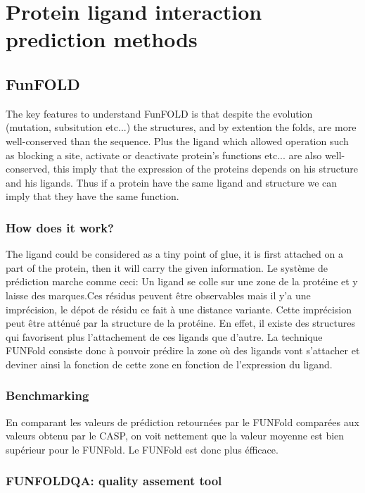 \section{Protein ligand interaction prediction methods}
\subsection{FunFOLD}
The key features to understand FunFOLD is that despite the evolution (mutation, subsitution etc...) the structures, and by extention the folds, are more well-conserved than the sequence. Plus the ligand which allowed operation such as blocking a site, activate or deactivate protein's functions etc... are also well-conserved, this imply that the expression of the proteins depends on his structure and his ligands. Thus if a protein have the same ligand and structure we can imply that they have the same function.
\newline
\subsubsection{How does it work?}
The ligand could be considered as a tiny point of glue, it is first attached on a part of the protein, then it will carry the given information.
Le système de prédiction marche comme ceci:
\newline
Un ligand se colle sur une zone de la protéine et y laisse des marques.Ces résidus peuvent être observables mais il y'a une imprécision, le dépot de résidu ce fait à une distance variante. Cette imprécision peut être atténué par la structure de la protéine. En effet, il existe des structures qui favorisent plus l'attachement de ces ligands que d'autre. 
\newline
La technique FUNFold consiste donc à pouvoir prédire la zone où des ligands vont s'attacher et deviner ainsi la fonction de cette zone en fonction de l'expression du ligand.
\subsubsection{Benchmarking}
En comparant les valeurs de prédiction retournées par le FUNFold comparées aux valeurs obtenu par le CASP, on voit nettement que la valeur moyenne est bien supérieur pour le FUNFold. Le FUNFold est donc plus éfficace.
\subsubsection{FUNFOLDQA: quality assement tool}

